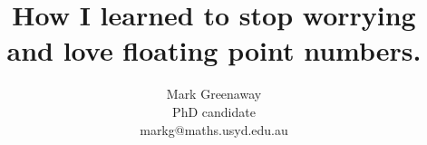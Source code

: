 \documentclass{beamer}
\title{How I learned to stop worrying and love floating point numbers.}
\author{Mark Greenaway \\ PhD candidate \\ markg@maths.usyd.edu.au}
\begin{document}
\begin{frame}
\maketitle
\end{frame}




\end{document}
